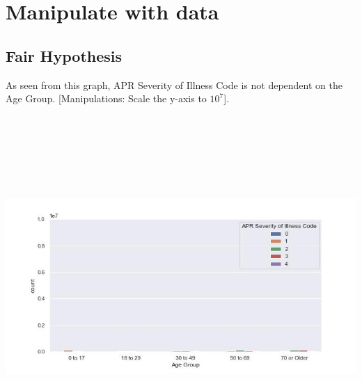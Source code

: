 \documentclass[
	letterpaper, %
]{jdf}
\begin{document}
\section{Manipulate with data}

\subsection{Fair Hypothesis}
As seen from this graph, APR Severity of Illness Code is not dependent on the Age Group. [Manipulations: Scale the y-axis to $10^7$].
\begin{jdffigure}
\includegraphics[height=13cm]{Figures/code-age-fair.jpg} \\
\label{fig:code-age-fair}%
\end{jdffigure}
\end{document}
